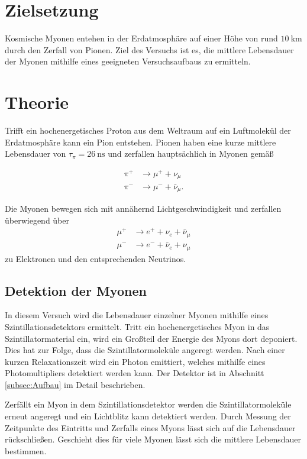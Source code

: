 \section{Zielsetzung}
\label{sec:Zielsetzung}
Kosmische Myonen entehen in der Erdatmosphäre auf einer Höhe von rund $\qty{10}{\kilo\metre}$ durch den Zerfall von Pionen. Ziel des Versuchs ist es, die 
mittlere Lebensdauer der Myonen mithilfe eines geeigneten Versuchsaufbaus zu ermitteln.


\section{Theorie}
\label{sec:Theorie}
Trifft ein hochenergetisches Proton aus dem Weltraum auf ein Luftmolekül der Erdatmosphäre kann ein Pion entstehen. Pionen haben eine kurze mittlere 
Lebensdauer von $\tau_\pi = \qty{26}{\nano\second}$ \cite{PDG:muon} und zerfallen hauptsächlich in Myonen gemäß

\begin{align*}
    \pi^+ &\to \mu^+ + \nu_\mu \\
    \pi^- &\to \mu^- + \bar{\nu}_\mu.
\end{align*}

Die Myonen bewegen sich mit annähernd Lichtgeschwindigkeit und zerfallen überwiegend über 
\begin{align*}
    \mu^+ &\to e^+ + \nu_e + \bar{\nu}_\mu \\
    \mu^- &\to e^- + \bar{\nu}_e + \nu_\mu
\end{align*}
zu Elektronen und den entsprechenden Neutrinos.

\subsection{Detektion der Myonen}
\label{subsec:Detektion der Myonen}
In diesem Versuch wird die Lebensdauer einzelner Myonen mithilfe eines Szintillationsdetektors ermittelt. Tritt ein hochenergetisches Myon in das Szintillatormaterial
ein, wird ein Großteil der Energie des Myons dort deponiert. Dies hat zur Folge, dass die Szintillatormoleküle angeregt werden. Nach einer kurzen Relaxationszeit
wird ein Photon emittiert, welches mithilfe eines Photomultipliers detektiert werden kann. Der Detektor ist in Abschnitt \ref{subsec:Aufbau} im Detail beschrieben.

Zerfällt ein Myon in dem Szintillationsdetektor werden die Szintillatormoleküle erneut angeregt und ein Lichtblitz kann detektiert werden. Durch Messung der Zeitpunkte des Eintritts
und Zerfalls eines Myons lässt sich auf die Lebensdauer rückschließen. Geschieht dies für viele Myonen lässt sich die mittlere Lebensdauer bestimmen.


